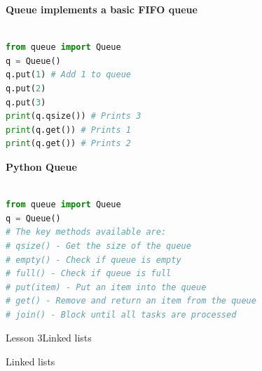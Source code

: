\documentclass[aspectratio=1610]{beamer}
\begin{document}
\begin{frame}[fragile]
\Large
\textbf{Queue implements a basic FIFO queue}\\~\\
\begin{lstlisting}[language=Python]
from queue import Queue
q = Queue()
q.put(1) # Add 1 to queue
q.put(2)
q.put(3)
print(q.qsize()) # Prints 3
print(q.get()) # Prints 1
print(q.get()) # Prints 2
\end{lstlisting}
\end{frame}



\begin{frame}[fragile]
\Large
\textbf{Python Queue}\\~\\
\begin{lstlisting}[language=Python]
from queue import Queue
q = Queue()
# The key methods available are:
# qsize() - Get the size of the queue
# empty() - Check if queue is empty
# full() - Check if queue is full
# put(item) - Put an item into the queue
# get() - Remove and return an item from the queue
# join() - Block until all tasks are processed
\end{lstlisting}
\end{frame}







\begin{frame}{Lesson 3}{Linked lists}
\begin{center}
\Huge Linked lists
\end{center}
\end{frame}
\end{document}
